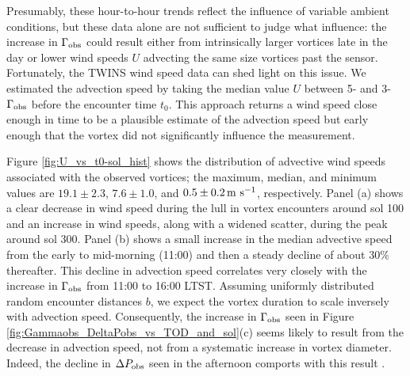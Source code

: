 \documentclass[linenumbers,trackchanges]{aastex63}
\begin{document}
Presumably, these hour-to-hour trends reflect the influence of variable ambient conditions, but these data alone are not sufficient to judge what influence: the increase in $\Gamma_{\rm obs}$ could result either from intrinsically larger vortices late in the day or lower wind speeds $U$ advecting the same size vortices past the sensor. Fortunately, the TWINS wind speed data can shed light on this issue. We estimated the advection speed by taking the median value $U$ between 5- and 3-$\Gamma_{\rm obs}$ before the encounter time $t_0$. This approach returns a wind speed close enough in time to be a plausible estimate of the advection speed but early enough that the vortex did not significantly influence the measurement. 

Figure \ref{fig:U_vs_t0-sol_hist} shows the distribution of advective wind speeds associated with the observed vortices; the maximum, median, and minimum values are $19.1\pm2.3$, $7.6\pm1.0$, and $0.5\pm0.2 \,{\rm m\ s^{-1}}$, respectively. Panel (a) shows a clear decrease in wind speed during the lull in vortex encounters around sol 100 and an increase in wind speeds, along with a widened scatter, during the peak around sol 300. Panel (b) shows a small increase in the median advective speed from the early to mid-morning (11:00) and then a steady decline of about 30\% thereafter. This decline in advection speed correlates very closely with the increase in $\Gamma_{\rm obs}$ from 11:00 to 16:00 LTST. Assuming uniformly distributed random encounter distances $b$, we expect the vortex duration to scale inversely with advection speed. Consequently, the increase in $\Gamma_{\rm obs}$ seen in Figure \ref{fig:Gammaobs_DeltaPobs_vs_TOD_and_sol}(c) seems likely to result from the decrease in advection speed, not from a systematic increase in vortex diameter. Indeed, the decline in $\Delta P_{\rm obs}$ seen in the afternoon comports with this result \citep{2020Icar..33813523J}.
\end{document}

